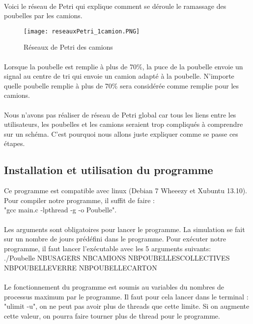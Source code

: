 \documentclass[12pt]{article}
\begin{document}
\paragraph{}Voici le réseau de Petri qui explique comment se déroule le ramassage des poubelles par les camions. 
\begin{figure}[h]
	\begin{center}
		\texttt{[image: reseauxPetri\_1camion.PNG]}
	\end{center}
	\caption{Réseaux de Petri des camions}
\label{Petri}
\end{figure}
\paragraph{}Lorsque la poubelle est remplie à plus de 70\%, la puce de la poubelle envoie un signal au centre de tri qui envoie un camion adapté à la poubelle. N'importe quelle poubelle remplie à plus de 70\% sera considérée comme remplie pour les camions.
\paragraph{}Nous n'avons pas réaliser de réseau de Petri global car tous les liens entre les utilisateurs, les poubelles et les camions seraient trop compliqués à comprendre sur un schéma. C'est pourquoi nous allons juste expliquer comme se passe ces étapes. 

\subsection{Installation et utilisation du programme}Ce programme est compatible avec linux (Debian 7 Wheeezy et Xubuntu 13.10). Pour compiler notre programme, il suffit de faire :\\ "gcc main.c -lpthread -g -o Poubelle".
\paragraph{}Les arguments sont obligatoires pour lancer le programme. La simulation se fait sur un nombre de jours prédéfini dans le programme. Pour exécuter notre programme, il faut lancer l'exécutable avec les 5 arguments suivants: \\./Poubelle NBUSAGERS NBCAMIONS NBPOUBELLESCOLLECTIVES NBPOUBELLEVERRE NBPOUBELLECARTON

\paragraph{}Le fonctionnement du programme est soumis au variables du nombres de processus maximum par le programme. Il faut pour cela lancer dans le terminal : "ulimit -u", on ne peut pas avoir plus de threads que cette limite. Si on augmente cette valeur, on pourra faire tourner plus de thread pour le programme.
\end{document}
